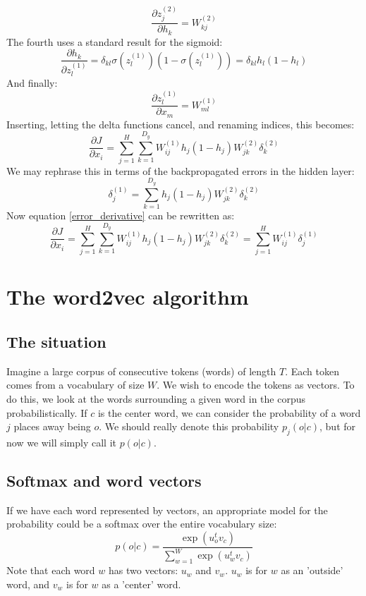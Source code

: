 \documentclass[12pt, a4paper]{article}
\numberwithin{equation}{section}
\begin{document}
\begin{equation}
\frac{\partial z^{(2)}_j}{\partial h_k}=W^{(2)}_{kj}
\end{equation}
The fourth uses a standard result for the sigmoid:
\begin{equation}
\frac{\partial h_k}{\partial z^{(1)}_l}=\delta_{kl}\sigma(z^{(1)}_l)(1-\sigma(z^{(1)}_l))=\delta_{kl}h_l(1-h_l)
\end{equation}
And finally:
\begin{equation}
\frac{\partial z^{(1)}_l}{\partial x_m}=W^{(1)}_{ml}
\end{equation}
Inserting, letting the delta functions cancel, and renaming indices, this becomes:
\begin{equation}
\label{error_derivative}
\frac{\partial J}{\partial x_i}=\sum_{j=1}^H\sum_{k=1}^{D_y}W^{(1)}_{ij}h_j(1-h_j)W^{(2)}_{jk}\delta^{(2)}_k
\end{equation}
We may rephrase this in terms of the backpropagated errors in the hidden layer:
\begin{equation}
\delta^{(1)}_j=\sum_{k=1}^{D_y}h_j(1-h_j)W^{(2)}_{jk}\delta^{(2)}_k
\end{equation}
Now equation \ref{error_derivative} can be rewritten as:
\begin{equation}
\frac{\partial J}{\partial x_i}=\sum_{j=1}^H\sum_{k=1}^{D_y}W^{(1)}_{ij}h_j(1-h_j)W^{(2)}_{jk}\delta^{(2)}_k=\sum_{j=1}^H W^{(1)}_{ij}\delta^{(1)}_j
\end{equation}

\section{The word2vec algorithm}

\subsection{The situation}
Imagine a large corpus of consecutive tokens (words) of length $T$. Each token comes from a vocabulary of size $W$. We wish to encode the tokens as vectors. To do this, we look at the words surrounding a given word in the corpus probabilistically. If $c$ is the center word, we can consider the probability of a word $j$ places away being $o$. We should really denote this probability $p_j(o|c)$, but for now we will simply call it $p(o|c)$.

\subsection{Softmax and word vectors}
If we have each word represented by vectors, an appropriate model for the probability could be a softmax over the entire vocabulary size:
\begin{equation}
p(o|c)=\frac{\exp(u_o^t v_c)}{\sum_{w=1}^W\exp(u_w^t v_c)}
\end{equation}
Note that each word $w$ has two vectors: $u_w$ and $v_w$. $u_w$ is for $w$ as an 'outside' word, and $v_w$ is for $w$ as a 'center' word.
\end{document}
